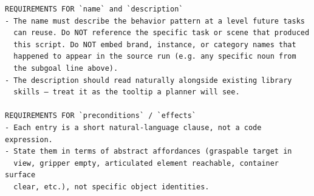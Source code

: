 \begin{lstlisting}[style=ratsappendixprompt]
REQUIREMENTS FOR `name` and `description`
- The name must describe the behavior pattern at a level future tasks
  can reuse. Do NOT reference the specific task or scene that produced
  this script. Do NOT embed brand, instance, or category names that
  happened to appear in the source run (e.g. any specific noun from
  the subgoal line above).
- The description should read naturally alongside existing library
  skills — treat it as the tooltip a planner will see.

REQUIREMENTS FOR `preconditions` / `effects`
- Each entry is a short natural-language clause, not a code expression.
- State them in terms of abstract affordances (graspable target in
  view, gripper empty, articulated element reachable, container surface
  clear, etc.), not specific object identities.
\end{lstlisting}

